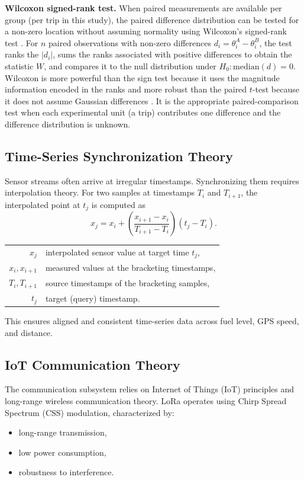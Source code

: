 \textbf{Wilcoxon signed-rank test.} When paired measurements are available per group (per trip in this study), the paired difference distribution can be tested for a non-zero location without assuming normality using Wilcoxon's signed-rank test \cite{wilcoxon1945individual}. For $n$ paired observations with non-zero differences $d_i = \theta_i^{A} - \theta_i^{B}$, the test ranks the $|d_i|$, sums the ranks associated with positive differences to obtain the statistic $W$, and compares it to the null distribution under $H_0: \mathrm{median}(d) = 0$. Wilcoxon is more powerful than the sign test because it uses the magnitude information encoded in the ranks and more robust than the paired $t$-test because it does not assume Gaussian differences \cite{demsar2006statistical}. It is the appropriate paired-comparison test when each experimental unit (a trip) contributes one difference and the difference distribution is unknown.

\subsection{Time-Series Synchronization Theory}

Sensor streams often arrive at irregular timestamps. Synchronizing them requires interpolation theory. For two samples at timestamps $T_i$ and $T_{i+1}$, the interpolated point at $t_j$ is computed as
\begin{equation}
x_j = x_i + \left( \frac{x_{i+1} - x_i}{T_{i+1} - T_i} \right)(t_j - T_i).
\label{eq:interpolation-ch3}
\end{equation}
\begin{tabular}{@{}r@{~=~}l@{}}
$x_j$ & interpolated sensor value at target time $t_j$, \\
$x_i, x_{i+1}$ & measured values at the bracketing timestamps, \\
$T_i, T_{i+1}$ & source timestamps of the bracketing samples, \\
$t_j$ & target (query) timestamp.
\end{tabular}

\vspace{0.5em}
This ensures aligned and consistent time-series data across fuel level, GPS speed, and distance.

\subsection{IoT Communication Theory}

The communication subsystem relies on Internet of Things (IoT) principles and long-range wireless communication theory. LoRa operates using Chirp Spread Spectrum (CSS) modulation, characterized by:
\begin{itemize}
    \item long-range transmission,
    \item low power consumption,
    \item robustness to interference.
\end{itemize}

